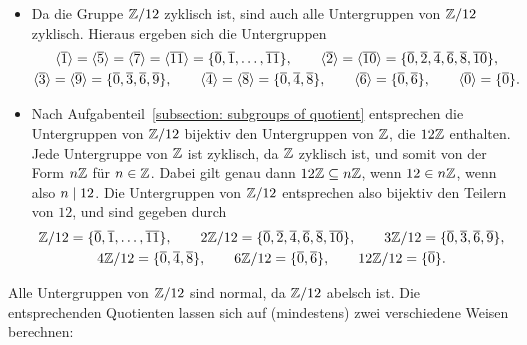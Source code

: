 \begin{itemize}
  \item
    Da die Gruppe $\mathbb{Z}/12$ zyklisch ist, sind auch alle Untergruppen von $\mathbb{Z}/12$ zyklisch.
    Hieraus ergeben sich die Untergruppen
    \begin{gather*}
          \langle \overline{1} \rangle
       =  \langle \overline{5} \rangle
       =  \langle \overline{7} \rangle
       =  \langle \overline{11} \rangle
       =  \{ \overline{0}, \overline{1}, \dotsc, \overline{11} \},
      \qquad
          \langle \overline{2} \rangle
       =  \langle \overline{10} \rangle
       =  \{ \overline{0}, \overline{2}, \overline{4}, \overline{6}, \overline{8}, \overline{10} \},
      \\
          \langle \overline{3} \rangle
       =  \langle \overline{9} \rangle
       =  \{ \overline{0}, \overline{3}, \overline{6}, \overline{9}\},
      \qquad
          \langle \overline{4} \rangle
       =  \langle \overline{8} \rangle
       =  \{ \overline{0}, \overline{4}, \overline{8} \},
      \qquad
          \langle \overline{6} \rangle
       =  \{ \overline{0}, \overline{6} \},
      \qquad
          \langle \overline{0} \rangle
       =  \{ \overline{0} \}.
    \end{gather*}
  \item
    Nach Aufgabenteil~\ref{subsection: subgroups of quotient} entsprechen die Untergruppen von $\mathbb{Z}/12$ bijektiv den Untergruppen von $\mathbb{Z}$, die $12\mathbb{Z}$ enthalten.
    Jede Untergruppe von $\mathbb{Z}$ ist zyklisch, da $\mathbb{Z}$ zyklisch ist, und somit von der Form $n\mathbb{Z}$ für $n \in \mathbb{Z}$.
    Dabei gilt genau dann $12\mathbb{Z} \subseteq n\mathbb{Z}$, wenn $12 \in n\mathbb{Z}$, wenn also $n \mathrel{|} 12$.
    Die Untergruppen von $\mathbb{Z}/12$ entsprechen also bijektiv den Teilern von $12$, und sind gegeben durch
    \begin{gather*}
       \mathbb{Z}/12  = \{ \overline{0}, \overline{1}, \dotsc, \overline{11} \},
      \qquad
      2\mathbb{Z}/12  = \{ \overline{0}, \overline{2}, \overline{4}, \overline{6}, \overline{8}, \overline{10} \},
      \qquad
      3\mathbb{Z}/12  = \{ \overline{0}, \overline{3}, \overline{6}, \overline{9} \},
      \\
      4\mathbb{Z}/12  = \{ \overline{0}, \overline{4}, \overline{8} \},
      \qquad
      6\mathbb{Z}/12  = \{ \overline{0}, \overline{6} \},
      \qquad
      12\mathbb{Z}/12 = \{ \overline{0} \}.
    \end{gather*}
\end{itemize}

Alle Untergruppen von $\mathbb{Z}/12$ sind normal, da $\mathbb{Z}/12$ abelsch ist.
Die entsprechenden Quotienten lassen sich auf (mindestens) zwei verschiedene Weisen berechnen:

